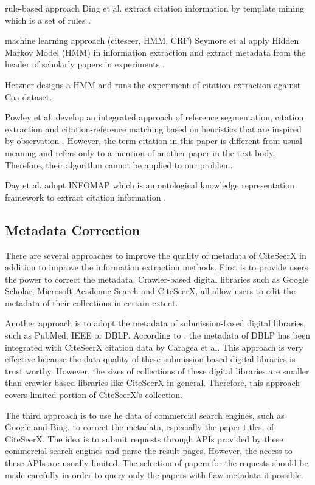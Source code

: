 \documentclass[prodmode]{acmsmall} %
\begin{document}
rule-based approach
Ding et al. extract citation information by template mining which is a set of rules \cite{Ding1999}.


machine learning approach (citeseer, HMM, CRF)
Seymore et al apply Hidden Markov Model (HMM) in information extraction and extract metadata from the header of scholarly papers in experiments \cite{Seymore1999}.

Hetzner designs a HMM and runs the experiment of citation extraction against Coa dataset\cite{Hetzner2008}.

Powley et al. develop an integrated approach of reference segmentation, citation extraction and citation-reference matching based on heuristics that are inspired by observation \cite{Powley2007}. However, the term citation in this paper is different from usual meaning and refers only to a mention of another paper in the text body. Therefore, their algorithm cannot be applied to our problem.


Day et al. adopt INFOMAP which is an ontological knowledge representation framework to extract citation information\cite{Day2005} \cite{Day2007}.

\subsection{Metadata Correction}

There are several approaches to improve the quality of metadata of CiteSeerX in addition to improve the information extraction methods. First is to provide users the power to correct the metadata. Crawler-based digital libraries such as Google Scholar, Microsoft Academic Search and CiteSeerX, all allow users to edit the metadata of their collections in certain extent. \cite{Wu2014a}

Another approach is to adopt the metadata of submission-based digital libraries, such as PubMed, IEEE or DBLP. According to \cite{OrorbiaII}, the metadata of DBLP has been integrated with CiteSeerX citation data by Caragea et al. This approach is very effective because the data quality of these submission-based digital libraries is trust worthy. However, the sizes of collections of these digital libraries are smaller than crawler-based libraries like CiteSeerX in general. Therefore, this approach covers limited portion of CiteSeerX's collection.

The third approach is to use he data of commercial search engines, such as Google and Bing, to correct the metadata, especially the paper titles, of CiteSeerX. The idea is to submit requests through APIs provided by these commercial search engines and parse the result pages. However, the access to these APIs are usually limited. The selection of papers for the requests should be made carefully in order to query only the papers with flaw metadata if possible. \cite{OrorbiaII}
\end{document}
